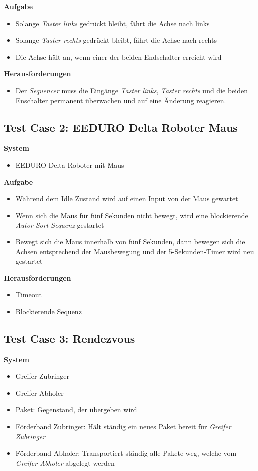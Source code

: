 \textbf{Aufgabe}
\begin{itemize}
\item Solange \textit{Taster links} gedrückt bleibt, fährt die Achse nach links
\item Solange \textit{Taster rechts} gedrückt bleibt, fährt die Achse nach rechts
\item Die Achse hält an, wenn einer der beiden Endschalter erreicht wird
\end{itemize}

\textbf{Herausforderungen}
\begin{itemize}
\item Der \textit{Sequencer} muss die Eingänge \textit{Taster links}, \textit{Taster rechts} und die beiden Enschalter permanent überwachen und auf eine Änderung reagieren.
\end{itemize}


\subsection{Test Case 2: EEDURO Delta Roboter Maus}
\textbf{System}
\begin{itemize}
\item EEDURO Delta Roboter mit Maus
\end{itemize}

\textbf{Aufgabe}
\begin{itemize}
\item Während dem Idle Zustand wird auf einen Input von der Maus gewartet
\item Wenn sich die Maus für fünf Sekunden nicht bewegt, wird eine blockierende \textit{Autor-Sort Sequenz} gestartet
\item Bewegt sich die Maus innerhalb von fünf Sekunden, dann bewegen sich die Achsen entsprechend der Mausbewegung und der 5-Sekunden-Timer wird neu gestartet
\end{itemize}

\textbf{Herausforderungen}
\begin{itemize}
\item Timeout
\item Blockierende Sequenz
\end{itemize}


\subsection{Test Case 3: Rendezvous}
\textbf{System}
\begin{itemize}
\item Greifer Zubringer
\item Greifer Abholer
\item Paket: Gegenstand, der übergeben wird
\item Förderband Zubringer: Hält ständig ein neues Paket bereit für \textit{Greifer Zubringer}
\item Förderband Abholer: Transportiert ständig alle Pakete weg, welche vom \textit{Greifer Abholer} abgelegt werden
\end{itemize}

